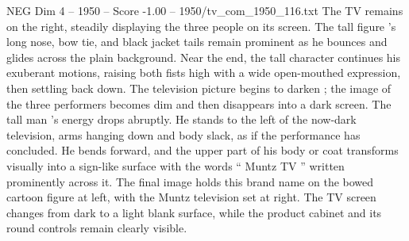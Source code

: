 \begin{textsample}{NEG Dim 4 – 1950 – Score -1.00 – 1950/tv\_com\_1950\_116.txt}
The TV remains on the right, steadily displaying the three people on its screen.
The tall figure ’s long nose, bow tie, and black jacket tails remain prominent as he bounces and glides across the plain background.
Near the end, the tall character continues his exuberant motions, raising both fists high with a wide open-mouthed expression, then settling back down.
The television picture begins to darken ; the image of the three performers becomes dim and then disappears into a dark screen.
The tall man ’s energy drops abruptly.
He stands to the left of the now-dark television, arms hanging down and body slack, as if the performance has concluded.
He bends forward, and the upper part of his body or coat transforms visually into a sign-like surface with the words “ Muntz TV ” written prominently across it.
The final image holds this brand name on the bowed cartoon figure at left, with the Muntz television set at right.
The TV screen changes from dark to a light blank surface, while the product cabinet and its round controls remain clearly visible.

\end{textsample}
